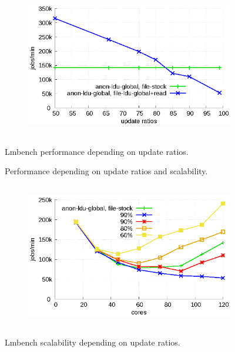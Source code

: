 \begin{figure}[t!]
    \centering
    \begin{subfigure}[b]{1\textwidth}
  \begin{center}
        \includegraphics[height=2.5in]{graph/ratio_lmbench.eps}
  \end{center}
    \end{subfigure}%
    \caption{Lmbench performance depending on update ratios.}
    \caption{Performance depending on update ratios and scalability.}
    \label{fig:UpdateRate_lmbench}
\end{figure}

\begin{figure}[t!]
    \centering
    \begin{subfigure}[b]{1\textwidth}
        \includegraphics[height=2.5in]{graph/ratio_lmbench_core.eps}
    \end{subfigure}%
    \caption{Lmbench scalability depending on update ratios.}
    \label{fig:UpdateRate_lmbench_2}
\end{figure}



